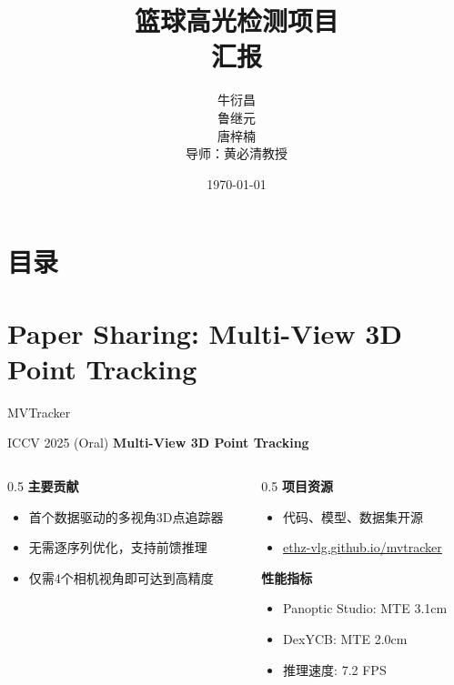 \documentclass{ctexbeamer}
\title[篮球高光检测]{篮球高光检测项目\\[2mm] 汇报}
\author[唐梓楠]{牛衍昌\\鲁继元\\唐梓楠\\[5mm] 导师：黄必清教授}
\institute[清华大学]{\small 清华大学}
\date{\small \vskip -10pt \today}
\begin{document}
\begin{frame}
  \maketitle
\end{frame}

\section*{目录}
\frame{
  \frametitle{\secname}
  \tableofcontents[hideallsubsections]
}

\section{Paper Sharing: Multi-View 3D Point Tracking}

\begin{frame}{MVTracker}
  \begin{block}{ICCV 2025 (Oral)}
    \textbf{Multi-View 3D Point Tracking}~\cite{Rajic_2025_ICCV}
  \end{block}
  \vspace{0.3cm}
  \begin{columns}[T]
    \begin{column}{0.5\textwidth}
      \textbf{主要贡献}
      \begin{itemize}
        \item 首个\alert{数据驱动}的多视角3D点追踪器
        \item 无需逐序列优化，支持前馈推理
        \item 仅需4个相机视角即可达到高精度
      \end{itemize}
    \end{column}
    \begin{column}{0.5\textwidth}
      \textbf{项目资源}
      \begin{itemize}
        \item 代码、模型、数据集开源
        \item \url{ethz-vlg.github.io/mvtracker}
      \end{itemize}
      \vspace{0.2cm}
      \textbf{性能指标}
      \begin{itemize}
        \item Panoptic Studio: MTE 3.1cm
        \item DexYCB: MTE 2.0cm
        \item 推理速度: 7.2 FPS
      \end{itemize}
    \end{column}
  \end{columns}
\end{frame}
\end{document}

